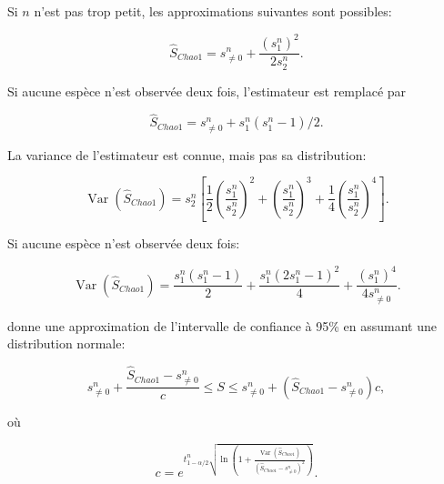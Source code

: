 \documentclass[
  11pt,
  french,
  a4paper,
  extrafontsizes,onecolumn,openright
  ]{memoir}
\begin{document}
Si \(n\) n'est pas trop petit, les approximations suivantes sont possibles:

\begin{equation}
  \label{eq:Chao1sansn}
  \hat{S}_\mathit{Chao1}
   = {s^{n}_{\ne 0}} + \frac{{\left(s^{n}_{1}\right)}^2}{2s^{n}_{2}}.
\end{equation}

Si aucune espèce n'est observée deux fois, l'estimateur est remplacé \autocite{Chao2004} par

\begin{equation}
  \label{eq:Chao1sansnf2}
  {\hat{S}}_\mathit{Chao1} 
  = {s^{n}_{\ne 0}}+{s^{n}_{1}\left(s^{n}_{1}-1\right)}/{2}.
\end{equation}

La variance de l'estimateur est connue, mais pas sa distribution:

\begin{equation}
  \label{eq:VarChao1}
  \operatorname{Var}{\left({\hat{S}}_\mathit{Chao1}\right)} 
   = {s^{n}_{2}}\left[\frac{1}{2}{\left(\frac{s^{n}_{1}}{s^{n}_{2}}\right)}^2 + {\left(\frac{s^{n}_{1}}{s^{n}_{2}}\right)}^3 + \frac{1}{4}{\left(\frac{s^{n}_{1}}{s^{n}_{2}}\right)}^4\right].
\end{equation}

Si aucune espèce n'est observée deux fois:

\begin{equation}
  \label{eq:VarChao1sansf2}
  \operatorname{Var}{\left({\hat{S}}_\mathit{Chao1}\right)}
  = \frac{s^{n}_{1}\left(s^{n}_{1}-1\right)}{2}
  + \frac{s^{n}_{1}{\left(2s^{n}_{1} -1\right)}^2}{4}
  + \frac{{\left(s^{n}_{1}\right)}^4}{4s^{n}_{\ne 0}}.
\end{equation}

\textcite{Chao1987} donne une approximation de l'intervalle de confiance à 95\% en assumant une distribution normale:

\begin{equation}
  \label{eq:ICChao1}
  s^{n}_{\ne 0}+\frac{{\hat{S}}_\mathit{Chao1}-{s^{n}_{\ne 0}}}{c}\le S\le {s^{n}_{\ne 0}}+\left({\hat{S}}_\mathit{Chao1}-{s^{n}_{\ne 0}}\right)c,
\end{equation}

où

\begin{equation}
  \label{eq:ICChao1c}
  c=e^{t^{n}_{1-{\alpha}/{2}}\sqrt{\ln\left(1+\frac{\operatorname{Var}\left({\hat{S}}_\mathit{Chao1}\right)}{{\left({\hat{S}}_\mathit{Chao1}-{s^{n}_{\ne 0}}\right)}^2}\right)}}.
\end{equation}
\end{document}
